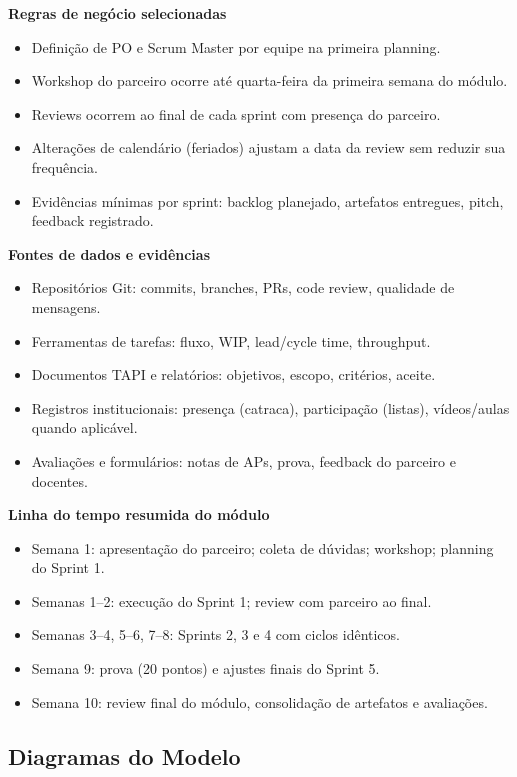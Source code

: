 \documentclass[12pt,a4paper]{article}
\begin{document}
\textbf{Regras de negócio selecionadas}

\begin{itemize}
  \item Definição de PO e Scrum Master por equipe na primeira planning.
  \item Workshop do parceiro ocorre até quarta-feira da primeira semana do módulo.
  \item Reviews ocorrem ao final de cada sprint com presença do parceiro.
  \item Alterações de calendário (feriados) ajustam a data da review sem reduzir sua frequência.
  \item Evidências mínimas por sprint: backlog planejado, artefatos entregues, pitch, feedback registrado.
\end{itemize}

\textbf{Fontes de dados e evidências}

\begin{itemize}
  \item Repositórios Git: commits, branches, PRs, code review, qualidade de mensagens.
  \item Ferramentas de tarefas: fluxo, WIP, lead/cycle time, throughput.
  \item Documentos TAPI e relatórios: objetivos, escopo, critérios, aceite.
  \item Registros institucionais: presença (catraca), participação (listas), vídeos/aulas quando aplicável.
  \item Avaliações e formulários: notas de APs, prova, feedback do parceiro e docentes.
\end{itemize}

\textbf{Linha do tempo resumida do módulo}

\begin{itemize}
  \item Semana 1: apresentação do parceiro; coleta de dúvidas; workshop; planning do Sprint 1.
  \item Semanas 1--2: execução do Sprint 1; review com parceiro ao final.
  \item Semanas 3--4, 5--6, 7--8: Sprints 2, 3 e 4 com ciclos idênticos.
  \item Semana 9: prova (20 pontos) e ajustes finais do Sprint 5.
  \item Semana 10: review final do módulo, consolidação de artefatos e avaliações.
\end{itemize}

\subsection{Diagramas do Modelo}
\end{document}
